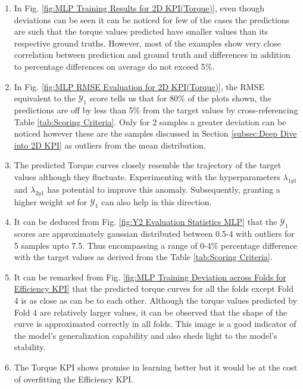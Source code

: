 \documentclass{report} %
\begin{document}
\begin{enumerate}[nosep]
    \item In Fig. \ref{fig:MLP Training Results for 2D KPI(Torque)}, even though deviations can be seen it can be noticed for few of the cases the predictions are such 
    that the torque values predicted have smaller values than its respective ground truths. However, most of the examples show very close correlation between prediction 
    and ground truth and differences in addition to percentage differences on average do not exceed 5\%. 
    \item In Fig. \ref{fig:MLP RMSE Evaluation for 2D KPI(Torque)}, the \ac{RMSE} equivalent to the $\mathcal{Y}_1$ score tells us that for 80\% of the plots shown, 
    the predictions are off by less than 5\% from the target values by cross-referencing Table \ref{tab:Scoring Criteria}. 
    Only for 2 samples a greater deviation can be noticed however these are the samples discussed in Section \ref{subsec:Deep Dive into 2D KPI} as outliers from the 
    mean distribution. 
    \item The predicted Torque curves closely resemble the trajectory of the target values although they fluctuate. Experimenting with the hyperparameters 
    \textit{$\lambda_{1y1}$} and \textit{$\lambda_{2y1}$} has potential to improve this anomaly. Subsequently, granting a higher weight \textit{wt} for $\mathcal{Y}_1$ 
    can also help in this direction.
    \item It can be deduced from Fig. \ref{fig:Y2 Evaluation Statistics MLP} that the $\mathcal{Y}_1$ scores are approximately gaussian distributed between 
    0.5-4 with outliers for 5 samples upto 7.5. Thus encompassing a range of 0-4\% percentage difference with the target values as derived from the Table \ref{tab:Scoring Criteria}.
    \item It can be remarked from Fig. \ref{fig:MLP Training Deviation across Folds for Efficiency KPI} that the predicted torque curves for all the folds except Fold 4 
    is as close as can be to each other. Although the torque values predicted by Fold 4 are relatively larger values, it can be observed that the shape of the curve is 
    approximated correctly in all folds. This image is a good indicator of the model's generalization capability and also sheds light to the model's stability.
    \item The Torque \ac{KPI} shows promise in learning better but it would be at the cost of overfitting the Efficiency \ac{KPI}.
    \\
\end{enumerate}
\end{document}
